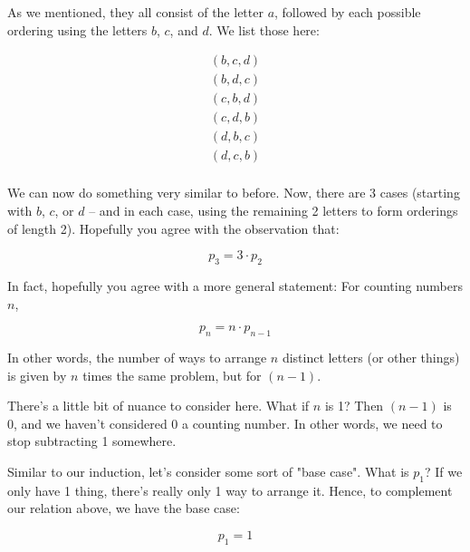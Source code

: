 As we mentioned, they all consist of the letter $a$, followed by each possible ordering using the letters $b$, $c$, and $d$. We list those here:

\begin{gather*}
(b, c, d) \\
(b, d, c) \\
(c, b, d) \\
(c, d, b) \\
(d, b, c) \\
(d, c, b) \\
\end{gather*}

We can now do something very similar to before. Now, there are 3 cases (starting with $b$, $c$, or $d$ -- and in each case, using the remaining 2 letters to form orderings of length 2). Hopefully you agree with the observation that:

\begin{equation*}
p_3 = 3 \cdot p_2
\end{equation*}


In fact, hopefully you agree with a more general statement: For counting numbers $n$,

\begin{equation}
p_n = n \cdot p_{n-1}
\end{equation}

In other words, the number of ways to arrange $n$ distinct letters (or other things) is given by $n$ times the same problem, but for $(n-1)$. 


There's a little bit of nuance to consider here. What if $n$ is 1? Then $(n-1)$ is 0, and we haven't considered 0 a counting number. In other words, we need to stop subtracting 1 somewhere.

Similar to our induction, let's consider some sort of "base case". What is $p_1$? If we only have 1 thing, there's really only 1 way to arrange it. Hence, to complement our relation above, we have the base case:

\begin{equation}
p_1 = 1
\end{equation}



